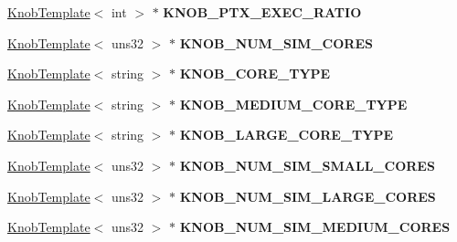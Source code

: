 \begin{DoxyCompactItemize}
\item 
\hypertarget{classall__knobs__c_a05e9bdca383b8c661d1c4aaafed1140e}{
\hyperlink{classKnobTemplate}{KnobTemplate}$<$ int $>$ $\ast$ {\bfseries KNOB\_\-PTX\_\-EXEC\_\-RATIO}}
\label{classall__knobs__c_a05e9bdca383b8c661d1c4aaafed1140e}

\item 
\hypertarget{classall__knobs__c_a523c7f215f2eb58b4c94dff7502773cc}{
\hyperlink{classKnobTemplate}{KnobTemplate}$<$ uns32 $>$ $\ast$ {\bfseries KNOB\_\-NUM\_\-SIM\_\-CORES}}
\label{classall__knobs__c_a523c7f215f2eb58b4c94dff7502773cc}

\item 
\hypertarget{classall__knobs__c_a9c01aec9e1b5f464777ba23cee578e86}{
\hyperlink{classKnobTemplate}{KnobTemplate}$<$ string $>$ $\ast$ {\bfseries KNOB\_\-CORE\_\-TYPE}}
\label{classall__knobs__c_a9c01aec9e1b5f464777ba23cee578e86}

\item 
\hypertarget{classall__knobs__c_a012dbc91f9190969e0a23156f07f13aa}{
\hyperlink{classKnobTemplate}{KnobTemplate}$<$ string $>$ $\ast$ {\bfseries KNOB\_\-MEDIUM\_\-CORE\_\-TYPE}}
\label{classall__knobs__c_a012dbc91f9190969e0a23156f07f13aa}

\item 
\hypertarget{classall__knobs__c_af6c50aca4c8636d13e88f5fbd662d5af}{
\hyperlink{classKnobTemplate}{KnobTemplate}$<$ string $>$ $\ast$ {\bfseries KNOB\_\-LARGE\_\-CORE\_\-TYPE}}
\label{classall__knobs__c_af6c50aca4c8636d13e88f5fbd662d5af}

\item 
\hypertarget{classall__knobs__c_aca875520e9536f6a951f3426f4ed823d}{
\hyperlink{classKnobTemplate}{KnobTemplate}$<$ uns32 $>$ $\ast$ {\bfseries KNOB\_\-NUM\_\-SIM\_\-SMALL\_\-CORES}}
\label{classall__knobs__c_aca875520e9536f6a951f3426f4ed823d}

\item 
\hypertarget{classall__knobs__c_ad54048adcc75d9526d2121cbe4f4cdc2}{
\hyperlink{classKnobTemplate}{KnobTemplate}$<$ uns32 $>$ $\ast$ {\bfseries KNOB\_\-NUM\_\-SIM\_\-LARGE\_\-CORES}}
\label{classall__knobs__c_ad54048adcc75d9526d2121cbe4f4cdc2}

\item 
\hypertarget{classall__knobs__c_ae0b022b66534742da6bfa3467f03f994}{
\hyperlink{classKnobTemplate}{KnobTemplate}$<$ uns32 $>$ $\ast$ {\bfseries KNOB\_\-NUM\_\-SIM\_\-MEDIUM\_\-CORES}}
\label{classall__knobs__c_ae0b022b66534742da6bfa3467f03f994}


\end{DoxyCompactItemize}
